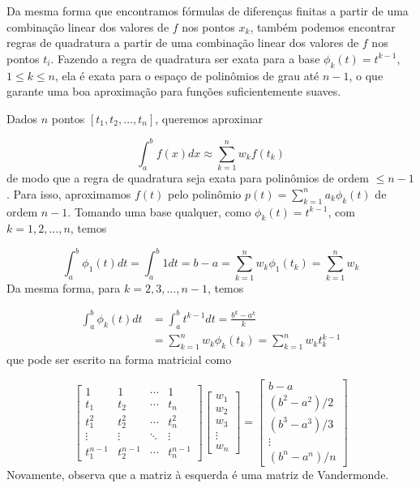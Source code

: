\documentclass{article}
\begin{document}
Da mesma forma que encontramos fórmulas de diferenças finitas a partir de uma combinação linear dos valores de \(f\) nos pontos \(x_k\), também podemos encontrar regras de quadratura a partir de uma combinação linear dos valores de \(f\) nos pontos \(t_i\). Fazendo a regra de quadratura ser exata para a base \(\phi_k(t) = t^{k-1}\), \(1 \leq k \leq n\), ela é exata para o espaço de polinômios de grau até \(n-1\), o que garante uma boa aproximação para funções suficientemente suaves.

Dados \(n\) pontos \([t_1, t_2, \ldots, t_n]\), queremos aproximar

\begin{equation}
    \int_{a}^{b} f(x) dx \approx \sum_{k=1}^{n} w_k f(t_k)
\end{equation}
de modo que a regra de quadratura seja exata para polinômios de ordem \(\leq n-1\). Para isso, aproximamos \(f(t)\) pelo polinômio \(p(t) = \sum_{k=1}^{n} a_k \phi_k(t)\) de ordem \(n-1\). Tomando uma base qualquer, como \(\phi_k(t) = t^{k-1}\), com \(k = 1, 2, \ldots, n\), temos

\begin{equation}
    \int_{a}^{b} \phi_1(t) dt = \int_{a}^{b} 1 dt = b - a = \sum_{k=1}^{n} w_k \phi_1(t_k) = \sum_{k=1}^{n} w_k
\end{equation}
Da mesma forma, para \(k = 2, 3, \ldots, n-1\), temos

\begin{align}
    \int_{a}^{b} \phi_k(t) dt & = \int_{a}^{b} t^{k-1} dt = \frac{b^k - a^k}{k} \\
    & = \sum_{k=1}^{n} w_k \phi_k(t_k) = \sum_{k=1}^{n} w_k t_k^{k-1}
\end{align}
que pode ser escrito na forma matricial como

\begin{equation}
    \begin{bmatrix}
        1 & 1 & \cdots & 1 \\
        t_1 & t_2 & \cdots & t_n \\
        t_1^2 & t_2^2 & \cdots & t_n^2 \\
        \vdots & \vdots & \ddots & \vdots \\
        t_1^{n-1} & t_2^{n-1} & \cdots & t_n^{n-1}
    \end{bmatrix}
    \begin{bmatrix}
        w_1 \\ w_2 \\ w_3 \\ \vdots \\ w_n
    \end{bmatrix}
    =
    \begin{bmatrix}
        b - a \\ (b^2 - a^2)/2 \\ (b^3 - a^3)/3 \\ \vdots \\ (b^n - a^n)/n
    \end{bmatrix}
\end{equation}
Novamente, observa que a matriz à esquerda é uma matriz de Vandermonde.
\end{document}
